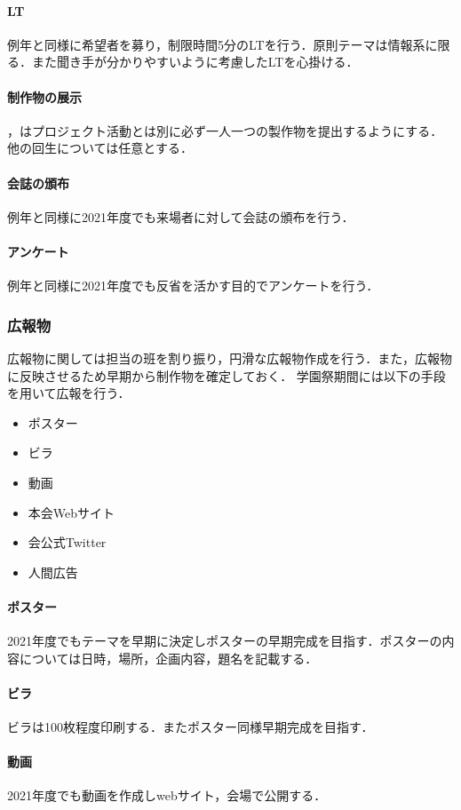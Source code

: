 \paragraph{LT}
例年と同様に希望者を募り，制限時間5分のLTを行う．原則テーマは情報系に限る．また聞き手が分かりやすいように考慮したLTを心掛ける．
\paragraph{制作物の展示}
\secondGrade{}，\thirdGrade{}はプロジェクト活動とは別に必ず一人一つの製作物を提出するようにする．他の回生については任意とする．
\paragraph{会誌の頒布}
例年と同様に2021年度でも来場者に対して会誌の頒布を行う．
\paragraph{アンケート}
例年と同様に2021年度でも反省を活かす目的でアンケートを行う．
\subsubsection*{広報物}
広報物に関しては担当の班を割り振り，円滑な広報物作成を行う．また，広報物に反映させるため早期から制作物を確定しておく．
学園祭期間には以下の手段を用いて広報を行う．
\begin{itemize}
    \item ポスター
    \item ビラ
    \item 動画
    \item 本会Webサイト
    \item 会公式Twitter
    \item 人間広告
\end{itemize}
\paragraph{ポスター}
2021年度でもテーマを早期に決定しポスターの早期完成を目指す．ポスターの内容については日時，場所，企画内容，題名を記載する．
\paragraph{ビラ}
ビラは100枚程度印刷する．またポスター同様早期完成を目指す．
\paragraph{動画}
2021年度でも動画を作成しwebサイト，会場で公開する．
